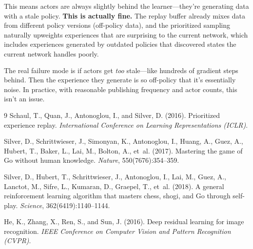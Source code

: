 \documentclass[11pt]{article}
\begin{document}
This means actors are always slightly behind the learner---they're generating data with a stale policy. \textbf{This is actually fine.} The replay buffer already mixes data from different policy versions (off-policy data), and the prioritized sampling naturally upweights experiences that are surprising to the current network, which includes experiences generated by outdated policies that discovered states the current network handles poorly.

The real failure mode is if actors get \textit{too} stale---like hundreds of gradient steps behind. Then the experience they generate is so off-policy that it's essentially noise. In practice, with reasonable publishing frequency and actor counts, this isn't an issue.

\begin{thebibliography}{9}
Schaul, T., Quan, J., Antonoglou, I., and Silver, D. (2016).
Prioritized experience replay.
\textit{International Conference on Learning Representations (ICLR)}.

Silver, D., Schrittwieser, J., Simonyan, K., Antonoglou, I., Huang, A., Guez, A., Hubert, T., Baker, L., Lai, M., Bolton, A., et~al. (2017).
Mastering the game of Go without human knowledge.
\textit{Nature}, 550(7676):354--359.

Silver, D., Hubert, T., Schrittwieser, J., Antonoglou, I., Lai, M., Guez, A., Lanctot, M., Sifre, L., Kumaran, D., Graepel, T., et~al. (2018).
A general reinforcement learning algorithm that masters chess, shogi, and Go through self-play.
\textit{Science}, 362(6419):1140--1144.

He, K., Zhang, X., Ren, S., and Sun, J. (2016).
Deep residual learning for image recognition.
\textit{IEEE Conference on Computer Vision and Pattern Recognition (CVPR)}.
\end{thebibliography}
\end{document}
